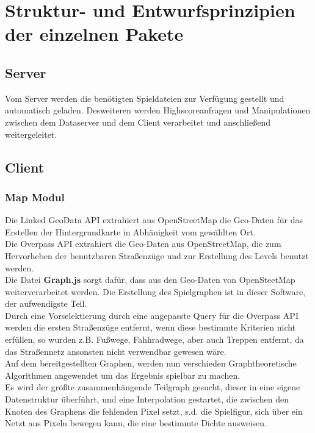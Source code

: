 \documentclass[11pt,a4paper]{article}
\begin{document}
\section{Struktur- und Entwurfsprinzipien der einzelnen Pakete}
\subsection{Server} Vom Server werden die benötigten Spieldateien zur Verfügung gestellt und automatisch geladen. Desweiteren werden Highscoreanfragen und Manipulationen zwischen dem Dataserver und dem Client verarbeitet und anschließend weitergeleitet.

\subsection{Client}
\subsubsection{Map Modul}
Die Linked GeoData API extrahiert aus OpenStreetMap die Geo-Daten für das Erstellen der Hintergrundkarte in Abhänigkeit vom gewählten Ort.\\
Die Overpass API extrahiert die Geo-Daten aus OpenStreetMap, die zum Hervorheben der benutzbaren Straßenzüge und zur Erstellung des Levels benutzt werden.\\
Die Datei \textbf{Graph.js} sorgt dafür, dass aus den Geo-Daten von OpenSteetMap weiterverarbeitet werden.
Die Erstellung des Spielgraphen ist in dieser Software, der aufwendigste Teil. \\
Durch eine Vorselektierung durch eine angepasste Query für die Overpass API werden die ersten Straßenzüge entfernt, wenn diese bestimmte Kriterien nicht erfüllen, so wurden z.B. Fußwege, Fahhradwege, aber auch Treppen entfernt, da das Straßennetz ansonsten nicht verwendbar gewesen wäre. \\
Auf dem bereitgestellten Graphen, werden nun verschieden Graphtheoretische Algorithmen angewendet um das Ergebnis spielbar zu machen. \\
Es wird der größte zusammenhängende Teilgraph gesucht, dieser in eine eigene Datenstruktur überführt, und eine Interpolation gestartet, die zwischen den Knoten des Graphens die fehlenden Pixel setzt, s.d. die Spielfigur, sich über ein Netzt aus Pixeln bewegen kann, die eine bestimmte Dichte ausweisen.
\end{document}

